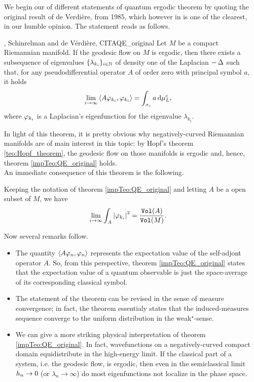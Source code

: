 We begin our  of different statements of quantum ergodic theorem by quoting the original result of de Verdière, from 1985, which however in is one of the clearest, in our humble opinion. The statement reads as follows.

\begin{impTeo}{\QE, Schinrelman and de Vérdière, CITA}{QE_original}
Let $M$ be a compact Riemannian manifold. If the geodesic flow on $M$ is ergodic, then there exists a subsequence of eigenvalues $\{\lambda_{k_{i}}\}_{i\in\mathbb{N}}$ of density one of the Laplacian $-\operatorname{\Delta}$ such that, for any pseudodifferential operator $A$ of order zero with principal symbol $a$, it holds
\[
\lim_{i\to \infty}\left< A\varphi_{k_{i}},\varphi_{k_{i}}\right>=\int_{\sigma_{c}}a \mathop{}\!\mathrm{d}\mu^{c}_{L}, 
\]
where $\varphi_{k_{i}}$ is a Laplacian's eigenfunction for the eigenvalue $\lambda_{k_{i}}$.
\end{impTeo}

In light of this theorem, it is pretty obvious why negatively-curved Riemannian manifolds are of main interest in this topic: by Hopf's theorem \ref{teo:Hopf_theorem}, the geodesic flow on those manifolds is ergodic and, hence, theorem \ref{impTeo:QE_original} holds.\\

An immediate consequence of this theorem is the following.

\begin{cor}
\label{cor:liouville_density}
Keeping the notation of theorem \ref{impTeo:QE_original} and letting $A$ be a open subset of $M$, we have
\[
\lim_{i\to\infty}\int_{A}\left| \varphi_{k_{i}}\right|^{2}=\frac{\operatorname{\mathtt{Vol}}(A)}{\operatorname{\mathtt{Vol}}(M)}.
\]
\end{cor}

Now several remarks follow.

\begin{remark}
\begin{itemize}
\item The quantity $\left< A\varphi_{n},\varphi_{n}\right>$ represents the expectation value of the self-adjont operator $A$. So, from this perspective, theorem \ref{impTeo:QE_original} states that the expectation value of a quantum observable is just the space-average of its corresponding classical symbol.
\item The statement of the theorem can be revised in the sense of measure convergence; in fact, the theorem essentialy states that the induced-measures sequence converge to the uniform distribution in the weak$^{\star}$-sense.
\item We can give a more striking physical interpretation of theorem \ref{impTeo:QE_original}. In fact, wavefunctions on a negatively-curved compact domain equidistribute in the high-energy limit. If the classical part of a system, i.e. the geodesic flow, is ergodic, then even in the semiclassical limit $h_{n}\to0$ (or $\lambda_{n}\to\infty$) do most eigenfunctions not localize in the phase space.
\end{itemize}
\end{remark}

